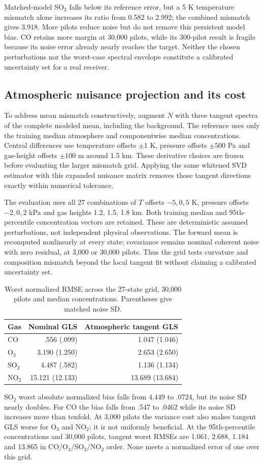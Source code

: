 \documentclass[conference]{IEEEtran}
\begin{document}
Matched-model SO$_2$ falls below its reference error, but a 5 K temperature mismatch alone increases its ratio from 0.582 to 2.992; the combined mismatch gives 3.918. More pilots reduce noise but do not remove this persistent model bias. CO retains more margin at 30,000 pilots, while its 300-pilot result is fragile because its noise error already nearly reaches the target. Neither the chosen perturbations nor the worst-case spectral envelope constitute a calibrated uncertainty set for a real receiver.



\subsection{Atmospheric nuisance projection and its cost}
To address mean mismatch constructively, augment $N$ with three tangent spectra of the complete modeled mean, including the background. The reference uses only the training median atmosphere and componentwise median concentrations. Central differences use temperature offsets $\pm1$ K, pressure offsets $\pm500$ Pa and gas-height offsets $\pm100$ m around 1.5 km. These derivative choices are frozen before evaluating the larger mismatch grid. Applying the same whitened SVD estimator with this expanded nuisance matrix removes those tangent directions exactly within numerical tolerance.

The evaluation uses all 27 combinations of $T$ offsets $-5,0,5$ K, pressure offsets $-2,0,2$ kPa and gas heights 1.2, 1.5, 1.8 km. Both training median and 95th-percentile concentration vectors are retained. These are deterministic assumed perturbations, not independent physical observations. The forward mean is recomputed nonlinearly at every state; covariance remains nominal coherent noise with zero residual, at 3,000 or 30,000 pilots. Thus the grid tests curvature and composition mismatch beyond the local tangent fit without claiming a calibrated uncertainty set.
\begin{table}[t]\centering\scriptsize
\caption{Worst normalized RMSE across the 27-state grid, 30,000 pilots and median concentrations. Parentheses give matched noise SD.}
\setlength{\tabcolsep}{3pt}
\begin{tabular}{lrr}\toprule
Gas & Nominal GLS & Atmospheric tangent GLS\\\midrule
CO & .556 (.099) & 1.047 (1.046)\\
O$_3$ & 3.190 (1.250) & 2.653 (2.650)\\
SO$_2$ & 4.487 (.582) & 1.136 (1.134)\\
NO$_2$ & 15.121 (12.133) & 13.689 (13.684)\\
\bottomrule\end{tabular}\end{table}
SO$_2$ worst absolute normalized bias falls from 4.449 to .0724, but its noise SD nearly doubles. For CO the bias falls from .547 to .0462 while its noise SD increases more than tenfold. At 3,000 pilots the variance cost also makes tangent GLS worse for O$_3$ and NO$_2$; it is not uniformly beneficial. At the 95th-percentile concentrations and 30,000 pilots, tangent worst RMSEs are 1.061, 2.688, 1.184 and 13.865 in CO/O$_3$/SO$_2$/NO$_2$ order. None meets a normalized error of one over this grid.
\end{document}
